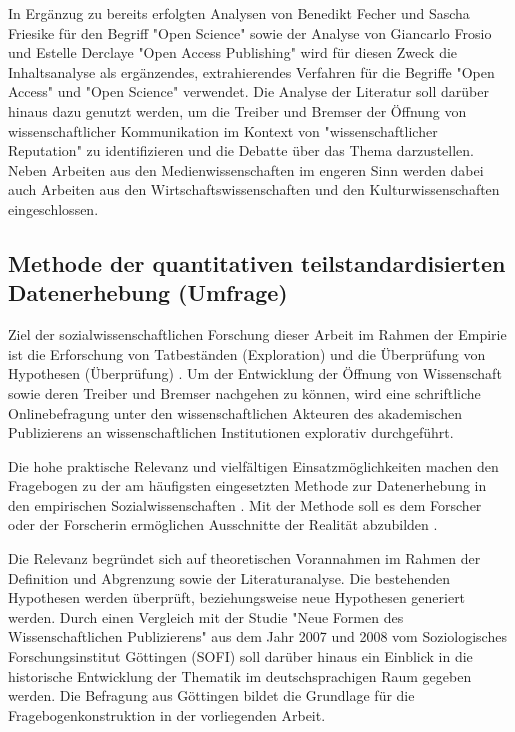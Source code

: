 In Ergänzug zu bereits erfolgten Analysen von Benedikt Fecher und Sascha Friesike für den Begriff "Open Science"\cite{cite:9} sowie der Analyse von Giancarlo Frosio und Estelle Derclaye "Open Access Publishing" \cite{CREATe_2014} wird für diesen Zweck die Inhaltsanalyse als ergänzendes, extrahierendes Verfahren für die Begriffe "Open Access" und "Open Science" verwendet. Die Analyse der Literatur soll darüber hinaus dazu genutzt werden, um die Treiber und Bremser der Öffnung von wissenschaftlicher Kommunikation im Kontext von "wissenschaftlicher Reputation" zu identifizieren und die Debatte über das Thema darzustellen. Neben Arbeiten aus den Medienwissenschaften im engeren Sinn werden dabei auch Arbeiten aus den Wirtschaftswissenschaften und den Kulturwissenschaften eingeschlossen.

\subsection{Methode der quantitativen teilstandardisierten Datenerhebung (Umfrage)}

Ziel der sozialwissenschaftlichen Forschung dieser Arbeit im Rahmen der Empirie ist die Erforschung von Tatbeständen (Exploration) und die Überprüfung von Hypothesen (Überprüfung) \cite{raab_2012_fragebogen}. Um der Entwicklung der Öffnung von Wissenschaft sowie deren Treiber und Bremser nachgehen zu können, wird eine schriftliche Onlinebefragung unter den wissenschaftlichen Akteuren des akademischen Publizierens an wissenschaftlichen Institutionen explorativ durchgeführt.

Die hohe praktische Relevanz und vielfältigen Einsatzmöglichkeiten machen den Fragebogen zu der am häufigsten eingesetzten Methode zur Datenerhebung in den empirischen Sozialwissenschaften \cite{raab_2012_fragebogen}. Mit der Methode soll es dem Forscher oder der Forscherin ermöglichen Ausschnitte der Realität abzubilden \cite{raab_2012_fragebogen}.

Die Relevanz begründet sich auf theoretischen Vorannahmen im Rahmen der Definition und Abgrenzung sowie der Literaturanalyse. Die bestehenden Hypothesen werden überprüft, beziehungsweise neue Hypothesen generiert werden. Durch einen Vergleich mit der Studie "Neue Formen des Wissenschaftlichen Publizierens" aus dem Jahr 2007 und 2008 vom Soziologisches Forschungsinstitut Göttingen (SOFI) soll darüber hinaus ein Einblick in die historische Entwicklung der Thematik im deutschsprachigen Raum gegeben werden. Die Befragung aus Göttingen bildet die Grundlage für die Fragebogenkonstruktion in der vorliegenden Arbeit.

